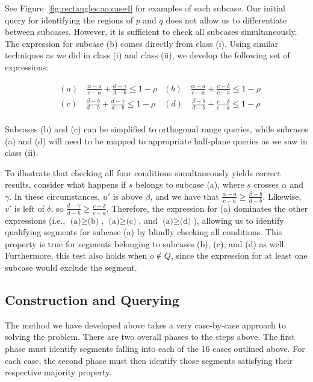 See Figure~\ref{fig:rectangles:ao:case4} for examples of each subcase. Our initial query for identifying the regions of $p$ and $q$ does not allow us to differentiate between subcases. However, it is sufficient to check all subcases simultaneously. The expression for subcase (b) comes directly from class (i).  Using similar techniques as we did in class (i) and class (ii), we develop the following set of expressions:

\begin{align*}
& (a) \quad \frac{\alpha - a}{c - a} + \frac{d - \gamma}{d - b} \leq 1 - \rho
& (b) \quad \frac{\alpha - a}{c - a} + \frac{c - \delta}{c - a} \leq 1 - \rho \\
& (c) \quad \frac{\beta  - b}{d - b} + \frac{d - \gamma}{d - b} \leq 1 - \rho  
& (d) \quad \frac{\beta  - b}{d - b} + \frac{c - \delta}{c - a} \leq 1 - \rho \\
\end{align*}

Subcases (b) and (c) can be simplified to orthogonal range queries, while subcases (a) and (d) will need to be mapped to appropriate half-plane queries as we saw in class (ii).

To illustrate that checking all four conditions simultaneously yields correct results, consider what happens if $s$ belongs to subcase (a), where $s$ crosses $\alpha$ and $\gamma$. In these circumstances, $u'$ is above $\beta$, and we have that $\frac{\alpha - a}{c - a} \geq \frac{\beta - b}{d - b}$.  Likewise, $v'$ is left of $\delta$, so $\frac{d - \gamma}{d - b} \geq \frac{c - \delta}{c - a}$.  Therefore, the expression for (a) dominates the other expressions (i.e., $\text{(a)} \geq \text{(b)}$, $\text{(a)} \geq \text{(c)}$, and $\text{(a)} \geq \text{(d)}$), allowing us to identify qualifying segments for subcase (a) by blindly checking all conditions. This property is true for segments belonging to subcases (b), (c), and (d) as well. Furthermore, this test also holds when $o \not \in Q$, since the expression for at least one subcase would exclude the segment.


\subsection{Construction and Querying}
\label{:rectangles:ao:analysis}

The method we have developed above takes a very case-by-case approach to solving the problem. There are two overall phases to the steps above. The first phase must identify segments falling into each of the 16 cases outlined above. For each case, the second phase must then identify those segments satisfying their respective majority property. 

